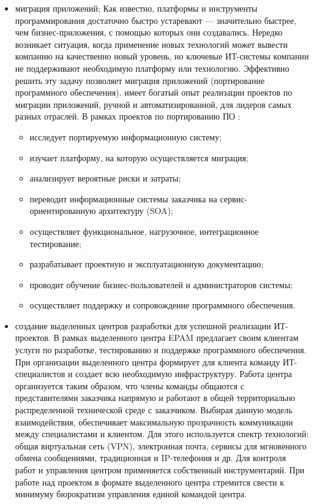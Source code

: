 \begin{itemize}
  \item миграция приложений;
  Как известно, платформы и инструменты программирования достаточно быстро устаревают — значительно быстрее, чем бизнес-приложения, с помощью которых они создавались. Нередко возникает ситуация, когда применение новых технологий может вывести компанию на качественно новый уровень, но ключевые ИТ-системы компании не поддерживают необходимую платформу или технологию. Эффективно решить эту задачу позволяет миграция приложений (портирование программного обеспечения).
  \company{} имеет богатый опыт реализации проектов по миграции приложений, ручной и автоматизированной, для лидеров самых разных отраслей.
  В рамках проектов по портированию ПО \company{}:
  \begin{itemize}
    \item исследует портируемую информационную систему;
    \item изучает платформу, на которую осуществляется миграция;
    \item анализирует вероятные риски и затраты;
    \item переводит информационные системы заказчика на сервис-ориентированную архитектуру (SOA);
    \item осуществляет функциональное, нагрузочное, интеграционное тестирование;
    \item разрабатывает проектную и эксплуатационную документацию;
    \item проводит обучение бизнес-пользователей и администраторов системы;
    \item осуществляет поддержку и сопровождение программного обеспечения.
  \end{itemize}

  \item создание выделенных центров разработки для успешной реализации ИТ-проектов.
  В рамках выделенного центра EPAM предлагает своим клиентам услуги по разработке, тестированию и поддержке программного обеспечения.
  При организации выделенного центра \company{} формирует для клиента команду ИТ-специалистов и создает всю необходимую инфраструктуру. Работа центра организуется таким образом, что члены команды общаются с представителями заказчика напрямую и работают в общей территориально распределенной технической среде с заказчиком.
  Выбирая данную модель взаимодействия, \company{} обеспечивает максимальную прозрачность коммуникации между специалистами и клиентом. Для этого используется спектр технологий: общая виртуальная сеть (VPN), электронная почта, сервисы для мгновенного обмена сообщениями, традиционная и IP-телефония и др. Для контроля работ и управления центром применяется собственный инструментарий.
  При работе над проектом в формате выделенного центра \company{} стремится свести к минимуму бюрократизм управления единой командой центра.
\end{itemize}


